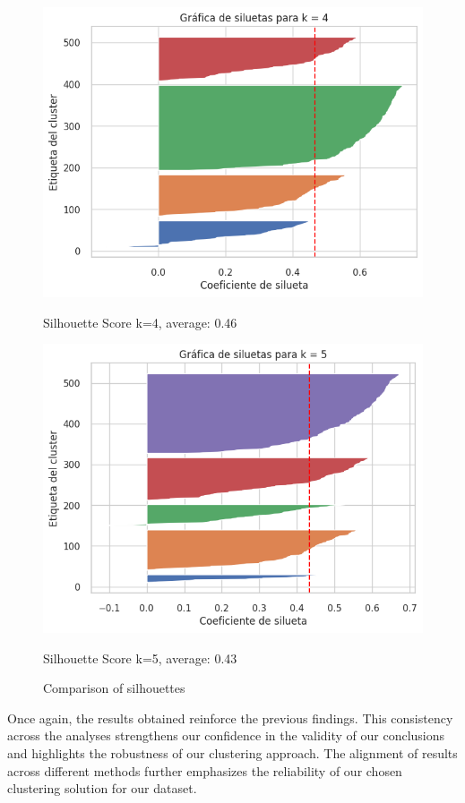\documentclass{article}
\begin{document}
\begin{figure}[H]
	\begin{minipage}{0.45\textwidth}
		\centering
		\includegraphics[width=\textwidth]{images/sil_4.png}
		\caption{Silhouette Score k=4, average: 0.46}
		\label{fig:sil4}
	\end{minipage}\hfill
	\begin{minipage}{0.45\textwidth}
		\centering
		\includegraphics[width=\textwidth]{images/sil_5.png}
		\caption{Silhouette Score k=5, average: 0.43}
		\label{fig:sil5}
	\end{minipage}
	
	\caption{Comparison of silhouettes}
	\label{fig:clustering_methods}
\end{figure}
Once again, the results obtained reinforce the previous findings. This consistency across the analyses strengthens our confidence in the validity of our conclusions and highlights the robustness of our clustering approach. The alignment of results across different methods further emphasizes the reliability of our chosen clustering solution for our dataset.
\end{document}
